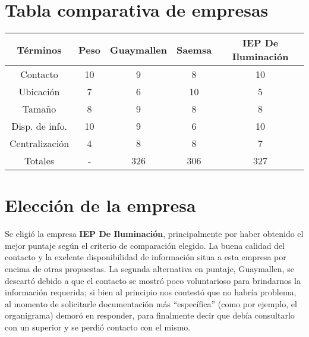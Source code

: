 \section{Tabla comparativa de empresas}
\begin{center}
\small\addtolength{\tabcolsep}{-5pt}
\begin{tabular}{|| c || c || c | c | c ||}
\hline
\hline
T\'{e}rminos & Peso & Guaymallen & Saemsa & IEP De Iluminaci\'on\\
\hline
Contacto   & 10 & 9 & 8 & 10 \\
\hline
Ubicaci\'{o}n & 7 & 6 & 10 & 5 \\
\hline
Tama\~{n}o & 8 & 9 & 8 & 8 \\
\hline
Disp. de info. & 10 & 9 & 6 & 10 \\
\hline
Centralizaci\'{o}n & 4 & 8 & 8 & 7 \\
\hline
\hline
Totales & - & 326 & 306 & 327 \\
\hline
\end{tabular}
\end{center}



\section{Elección de la empresa}
Se eligió la empresa \textbf{IEP De Iluminaci\'on}, principalmente por haber obtenido el mejor puntaje según el criterio de comparación elegido. La buena calidad del contacto y la exelente disponibilidad de información situa a esta empresa por encima de otras propuestas. La segunda alternativa en puntaje, 
Guaymallen, se descart\'o debido a que el contacto se mostr\'o poco voluntarioso para brindarnos la informaci\'on requerida; si bien al principio nos contest\'o que no habr\'ia problema, al momento de solicitarle documentaci\'on 
m\'as ``espec\'ifica'' (como por ejemplo, el organigrama) demor\'o en responder, para finalmente decir que deb\'ia consultarlo con un superior y se perdi\'o contacto con el mismo.

\pagebreak
